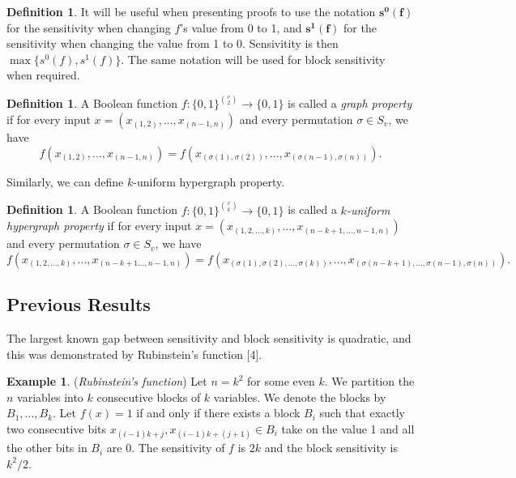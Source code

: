 \documentclass[psamsfonts]{amsart}
\theoremstyle{definition}
\newtheorem{defn}[theorem]{Definition}
\newtheorem{exmp}[theorem]{Example}
\theoremstyle{remark}
\numberwithin{equation}{section}
\begin{document}
\begin{defn}\label{oneandzero}
It will be useful when presenting proofs to use the notation $\boldsymbol{s^{0}(f)}$ for the sensitivity when changing $f$'s value from 0 to 1, 
and $\boldsymbol{s^{1}(f)}$ for the sensitivity when changing 
the value from 1 to 0.  Sensivitity is then $\max \{ s^{0}(f), s^{1}(f)\}$.  The same notation will be used for block sensitivity when required.  
\end{defn}

		\begin{defn}
			A Boolean function $f: \{0,1\}^{v \choose{2}} \to \{0,1\}$ is called a \textit{graph property} if for every input $x = (x_{(1,2)},...,x_{(n-1,n)})$ and every permutation $\sigma \in S_v$, we have
			\begin{equation}
				f(x_{(1,2)},...,x_{(n-1,n)}) = f(x_{(\sigma (1), \sigma (2))},...,x_{(\sigma (n-1), \sigma (n))}). \nonumber
			\end{equation}
		\end{defn}
		Similarly, we can define $k$-uniform hypergraph property.
			\begin{defn}
				A Boolean function $f: \{0,1\}^{v \choose{k}} \to \{0,1\}$ is called a \textit{$k$-uniform hypergraph property} if for every input $x = (x_{(1,2,...,k)},...,x_{(n-k+1,...,n-1,n)})$ and every permutation $\sigma \in S_v$, we have
			\begin{equation}
				f(x_{(1,2,...,k)},...,x_{(n-k+1...,n-1,n)}) = f(x_{(\sigma (1), \sigma (2),..., \sigma(k))},...,x_{(\sigma (n-k+1),...,\sigma (n-1), \sigma (n))}). \nonumber
			\end{equation}
			\end{defn}

	\subsection{Previous Results}

		The largest known gap between sensitivity and block sensitivity is quadratic, and this was demonstrated by Rubinstein's function [4].
	\begin{exmp} ({\it Rubinstein's function})
		Let $n = k^2$ for some even $k$. We partition the $n$ variables into $k$ consecutive blocks of $k$ variables. We denote the blocks by $B_1,...,B_k$. Let $f(x) = 1$ if and only if there exists a block $B_i$ such that exactly two consecutive bits $x_{(i-1)k+j}, x_{(i-1)k+(j+1)} \in B_i$ take on the value 1 and all the other bits in $B_i$ are 0. The sensitivity of $f$ is $2k$ and the block sensitivity is $k^2/2$.
	\end{exmp}
\end{document}
